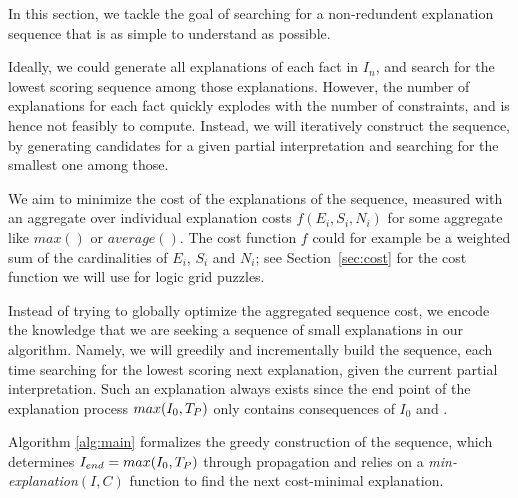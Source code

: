 In this section, we tackle the goal of searching for a non-redundent explanation sequence that is as simple to understand as possible. 

Ideally, we could generate all explanations of each fact in $I_n$, and search for the lowest scoring sequence among those explanations. However, the number of explanations for each fact quickly explodes with the number of constraints, and is hence not feasibly to compute. Instead, we will iteratively construct the sequence, by generating candidates for a given partial interpretation and searching for the smallest one among those.

We aim to minimize the cost of the explanations of the sequence, measured with an aggregate over individual explanation costs $f(E_i, S_i, N_i)$ for some aggregate like $max()$ or $average()$. The cost function $f$ could for example be a weighted sum of the cardinalities of $E_i$, $S_i$ and $N_i$; see Section~\ref{sec:cost} for the cost function we will use for logic grid puzzles.

Instead of trying to globally optimize the aggregated sequence cost, we encode the knowledge that we are seeking a sequence of small explanations in our algorithm. Namely, we will greedily and incrementally build the sequence, each time searching for the lowest scoring next explanation, given the current partial interpretation. Such an explanation always exists since the end point of the explanation process $max(I_0,T_P)$ only contains consequences of $I_0$ and \allconstraints. 

Algorithm \ref{alg:main} formalizes the greedy construction of the sequence, which determines $I_{end} = max(I_0,T_P)$  through propagation and relies on a \textit{min-explanation$(I,C)$} function to find the next cost-minimal explanation. %

